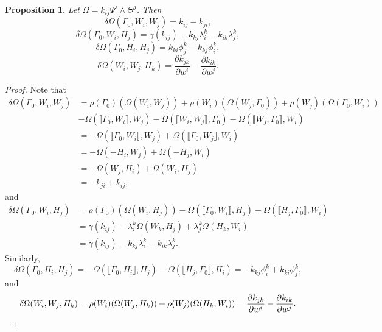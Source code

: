 \documentclass[11pt]{article}
\theoremstyle{plain}
\newtheorem{proposition}{Proposition}
\theoremstyle{definition}
\begin{document}
\begin{proposition}
Let $\Omega=k_{ij}\Psi^i\wedge \Theta^j$. Then
\begin{equation*}
    \delta \Omega(\Gamma_0,W_i,W_j)=k_{ij}-k_{ji},
\end{equation*}
\begin{equation*}
    \delta \Omega(\Gamma_0,W_i,H_j)=\gamma(k_{ij})-k_{kj} \lambda_i^k-k_{ik}\lambda_j^k,
\end{equation*}
\begin{equation*}
    \delta \Omega(\Gamma_0,H_i,H_j)=k_{ki}\phi_j^k-k_{kj}\phi_i^k,
\end{equation*}
\begin{equation*}
    \delta \Omega(W_i,W_j,H_k)=\frac{\partial k_{jk}}{\partial w^i}-\frac{\partial k_{ik}}{\partial w^j}.
\end{equation*}
\end{proposition}
\begin{proof}
Note that
\begin{align*}
    \delta \Omega(\Gamma_0,W_i,W_j)&=\rho(\Gamma_0)(\Omega(W_i,W_j))+\rho(W_i)(\Omega(W_j,\Gamma_0))+\rho(W_j)(\Omega(\Gamma_0,W_i))\\&-\Omega(\llbracket \Gamma_0,W_i\rrbracket,W_j)-\Omega(\llbracket W_i,W_j\rrbracket,\Gamma_0)-\Omega(\llbracket W_j,\Gamma_0\rrbracket, W_i)\\&=-\Omega(\llbracket \Gamma_0,W_i\rrbracket,W_j)+\Omega(\llbracket \Gamma_0,W_j\rrbracket,W_i)\\&=-\Omega(-H_i,W_j)+\Omega(-H_j,W_i)\\&=-\Omega(W_j,H_i)+\Omega(W_i,H_j)\\&=-k_{ji}+k_{ij},
\end{align*}
and
\begin{align*}
    \delta \Omega(\Gamma_0,W_i,H_j)&=\rho(\Gamma_0)(\Omega(W_i,H_j))-\Omega(\llbracket \Gamma_0,W_i\rrbracket,H_j)-\Omega(\llbracket H_j,\Gamma_0\rrbracket,W_i)\\&=\gamma(k_{ij})-\lambda_i^k \Omega(W_k,H_j)+\lambda_j^k\Omega(H_k,W_i)\\&=\gamma(k_{ij})-k_{kj} \lambda_i^k-k_{ik}\lambda_j^k.
\end{align*}
Similarly,
\begin{equation*}
    \delta \Omega(\Gamma_0,H_i,H_j)=-\Omega(\llbracket \Gamma_0,H_i\rrbracket,H_j)-\Omega(\llbracket H_j,\Gamma_0\rrbracket,H_i)=-k_{kj}\phi_i^k +k_{ki}\phi_j^k,
\end{equation*}
and
\begin{equation*}
    \delta \Omega(W_i,W_j,H_k)=\rho(W_i)(\Omega(W_j,H_k))+\rho(W_j)(\Omega(H_k,W_i))=\frac{\partial k_{jk}}{\partial w^i}-\frac{\partial k_{ik}}{\partial w^j}. \qedhere
\end{equation*}
\end{proof}
\end{document}
